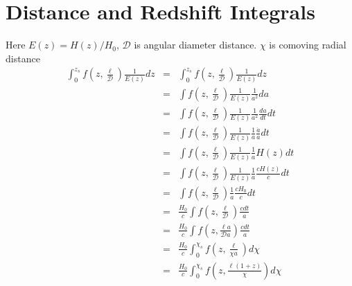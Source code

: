 \documentclass[12pt,a4paper]{article}
\begin{document}
	\section{Distance and Redshift Integrals}
			Here $ E(z) = H(z)/H_0$,  $\mathcal{D}$ is angular diameter distance. $\chi$ is comoving radial distance
			\begin{eqnarray}
			\int_0^{z_s} f\left(z, \frac{\ell}{\mathcal{D}}\right) \frac{1}{E(z)} dz & = & \int_0^{z_s} f\left(z, \frac{\ell}{\mathcal{D}}\right) \frac{1}{E(z)} dz \\
			&=& \int f\left(z, \frac{\ell}{\mathcal{D}}\right) \frac{1}{E(z)}  \frac{1}{a^2 }da \\
			&=& \int f\left(z, \frac{\ell}{\mathcal{D}}\right) \frac{1}{E(z)}  \frac{1}{a^2 } \frac{da}{dt}  dt \\
			&=& \int f\left(z, \frac{\ell}{\mathcal{D}}\right) \frac{1}{E(z)}  \frac{1}{a } \frac{\dot{a}}{a}  dt \\
			&=& \int f\left(z, \frac{\ell}{\mathcal{D}}\right) \frac{1}{E(z)}  \frac{1}{a }H(z)  dt \\
			&=& \int f\left(z, \frac{\ell}{\mathcal{D}}\right) \frac{1}{E(z)}  \frac{1}{a } \frac{c H(z)}{c}  dt \\
			&=& \int f\left(z, \frac{\ell}{\mathcal{D}}\right)  \frac{1}{a } \frac{cH_0}{c}  dt \\
			&=& \frac{H_0}{c}\int f\left(z, \frac{\ell}{\mathcal{D}}\right)  \frac{c dt}{a } \\
			&=& \frac{H_0}{c}\int f\left(z, \frac{\ell a}{\mathcal{D} a}\right)  \frac{c dt}{a } \\
			&=& \frac{H_0}{c}\int_0^{\chi_s} f\left(z, \frac{\ell }{\chi a}\right)  d\chi \\
			&=& \frac{H_0}{c}\int_0^{\chi_s} f\left(z, \frac{\ell (1 + z)}{\chi }\right)  d\chi \\
			\end{eqnarray}
\end{document}
